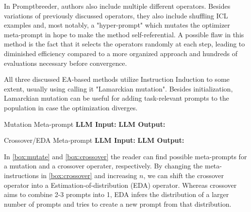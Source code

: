 In Promptbreeder\cite{fernando2023promptbreederselfreferentialselfimprovementprompt}, authors also include multiple different operators.
Besides variations of previously discussed operators, they also include shuffling ICL examples and, most notably, a "hyper-prompt" which mutates 
the optimizer meta-prompt in hope to make the method self-referential. A possible flaw in this method is the fact that it
selects the operators randomly at each step, leading to diminished efficiency compared to a more organized approach\cite{cui2024phaseevounifiedincontextprompt}
and hundreds of evaluations necessary before convergence\cite{wan2024teachbettersmarterinstructions}.

All three discussed EA-based methods utilize Instruction Induction\cite{honovich2022instructioninductionexamplesnatural} to some extent, usually
using calling it "Lamarckian mutation". Besides initialization, Lamarckian mutation can be useful for adding task-relevant prompts
to the population in case the optimization diverges\cite{fernando2023promptbreederselfreferentialselfimprovementprompt}. 

\begin{promptbox}
    [label={box:mutate}]{Mutation Meta-prompt}
    \textbf{LLM Input:} 
    \textbf{LLM Output:} 
\end{promptbox}

\begin{promptbox}
    [label={box:crossover}]{Crossover/EDA Meta-prompt}
    \textbf{LLM Input:} 
    \textbf{LLM Output:}
\end{promptbox}

In \ref{box:mutate} and \ref{box:crossover} the reader can find possible meta-prompts for a mutation and a crossover operater, respectively.
By changing the meta-instructions in \ref{box:crossover} and increasing $n$, we can shift the crossover operator into a Estimation-of-distribution (EDA)
operator. Whereas crossover aims to combine 2-3 prompts into 1, EDA infers the distribution of a larger number of prompts and tries to 
create a new prompt from that distribution. 


